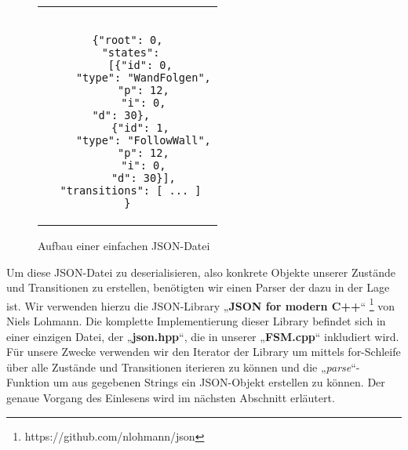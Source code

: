 \begin{figure}[thp]
\begin{tabular}{c}
\begin{lstlisting}[style=json]

{"root": 0,
 "states":
    [{"id": 0,
     "type": "WandFolgen",
     "p": 12,
     "i": 0,
     "d": 30},       
    {"id": 1,
     "type": "FollowWall",
     "p": 12,
     "i": 0,
     "d": 30}],
 "transitions": [ ... ]
}

\end{lstlisting}
\end{tabular}
\centering
\caption{Aufbau einer einfachen JSON-Datei}
\end{figure}

Um diese JSON-Datei zu deserialisieren, also konkrete Objekte unserer Zustände
und Transitionen zu erstellen, benötigten wir einen Parser der dazu in der Lage
ist. Wir verwenden hierzu die JSON-Library „\textbf{JSON for modern C++}“ \footnote[1]{https://github.com/nlohmann/json} von Niels
Lohmann.
Die komplette Implementierung dieser Library befindet sich in einer einzigen
Datei, der „\textbf{json.hpp}“, die in unserer „\textbf{FSM.cpp}“ inkludiert wird.
Für unsere Zwecke verwenden wir den Iterator der Library um mittels
for-Schleife über alle Zustände und Transitionen iterieren zu können und die
„\textit{parse}“-Funktion um aus gegebenen Strings ein JSON-Objekt erstellen zu können.
Der genaue Vorgang des Einlesens wird im nächsten Abschnitt erläutert.